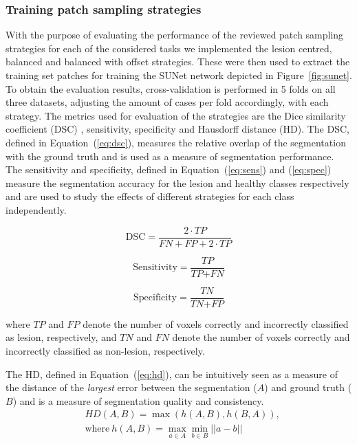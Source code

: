 \documentclass[letterpaper,final,authoryear,3p,times,twocolumn]{elsarticle}
\begin{document}
\subsubsection{Training patch sampling strategies}
With the purpose of evaluating the performance of the reviewed patch sampling strategies for each of the considered tasks we implemented the lesion centred, balanced and balanced with offset strategies. These were then used to extract the training set patches for training the SUNet network depicted in Figure~\ref{fig:sunet}. To obtain the evaluation results, cross-validation is performed in 5 folds on all three datasets, adjusting the amount of cases per fold accordingly, with each strategy. The metrics used for evaluation of the strategies are the Dice similarity coefficient (DSC) \citep{Dice1945}, sensitivity, specificity and Hausdorff distance (HD). The DSC, defined in Equation~(\ref{eq:dsc}), measures the relative overlap of the segmentation with the ground truth and is used as a measure of segmentation performance. The sensitivity and specificity, defined in Equation~(\ref{eq:sens}) and (\ref{eq:spec})  measure the segmentation accuracy for the lesion and healthy classes respectively and are used to study the effects of different strategies for each class independently.

\begin{equation} \label{eq:dsc}
\text{DSC} = \dfrac{2 \cdot \textit{TP}}{\textit{FN} + \textit{FP} + 2 \cdot \textit{TP}}
\end{equation}

\begin{equation} \label{eq:sens}
\text{Sensitivity} = \dfrac{\textit{TP}}{\textit{TP} + \textit{FN}}
\end{equation}

\begin{equation} \label{eq:spec}
\text{Specificity} = \dfrac{\textit{TN}}{\textit{TN} + \textit{FP}}
\end{equation}

\noindent
where $\textit{TP}$ and $\textit{FP}$ denote the number of voxels correctly and incorrectly classified as lesion, respectively, and $\textit{TN}$ and $\textit{FN}$ denote the number of voxels correctly and incorrectly classified as non-lesion, respectively.

The HD, defined in Equation~(\ref{eq:hd}), can be intuitively seen as a measure of the distance of the \textit{largest} error between the segmentation ($A$) and ground truth ($B$) and is a measure of segmentation quality and consistency.
\begin{equation} \label{eq:hd}
\begin{split}
& HD(A,B) = \max (h(A,B), h(B,A)), \\ &\text{where}~ h(A,B) = \max_{a \in A} \min_{b \in B} ||a - b||
\end{split}
\end{equation}
\end{document}
